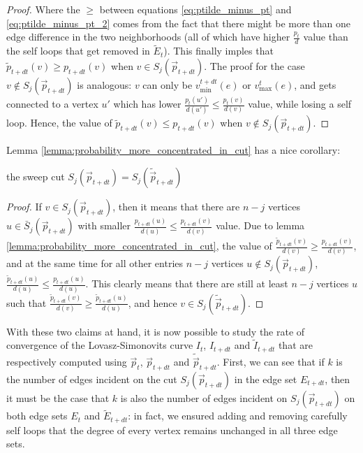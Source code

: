 \documentclass[../main.tex]{subfiles}
\begin{document}
\begin{proof}
    Where the $\geq$ between equations \ref{eq:ptilde_minus_pt} and \ref{eq:ptilde_minus_pt_2} comes from the fact that there might be more than one edge difference in the two neighborhoods (all of which have higher $\frac{p_t}{d}$ value than the self loops that get removed in $\tilde{E}_t$).
    This finally imples that $\tilde{p}_{t+dt}(v) \geq p_{t+dt}(v)$ when $v \in S_j(\vec{p}_{t+dt})$. The proof for the case $v \notin S_j(\vec{p}_{t+dt})$ is analogous: $v$ can only be $v_{\text{min}}^{t+dt}(e)$ or $v_{\text{max}}^{t}(e)$, and gets connected to a vertex $u'$ which has lower $\frac{p_t(u')}{d(u')} \leq \frac{p_t(v)}{d(v)}$ value, while losing a self loop. Hence, the value of $\tilde{p}_{t+dt}(v) \leq p_{t+dt}(v)$ when $v\notin S_j(\vec{p}_{t+dt})$.
\end{proof}

Lemma \ref{lemma:probability_more_concentrated_in_cut} has a nice corollary: 

\begin{corollary}
\label{corollary:cut_and_cut_tilde_are_the_same}
    the sweep cut $S_j(\vec{p}_{t+dt}) = S_j(\tilde{\vec{p}}_{t+dt})$
\end{corollary}

\begin{proof}
    If $v \in S_j(\vec{p}_{t+dt})$, then it means that there are $n - j$ vertices $u\in \bar{S}_j(\vec{p}_{t+dt})$ with smaller $\frac{p_{t+dt}(u)}{d(u)} \leq \frac{p_{t+dt}(v)}{d(v)}$ value. Due to lemma \ref{lemma:probability_more_concentrated_in_cut}, the value of $\frac{\tilde{p}_{t+dt}(v)}{d(v)} \geq \frac{p_{t+dt}(v)}{d(v)}$, and at the same time for all other entries $n-j$ vertices $u \notin S_j(\vec{p}_{t+dt})$, $\frac{\tilde{p}_{t+dt}(u)}{d(u)} \leq \frac{p_{t+dt}(u)}{d(u)}$. This clearly means that there are still at least $n-j$ vertices $u$ such that $\frac{\tilde{p}_{t+dt}(v)}{d(v)} \geq \frac{\tilde{p}_{t+dt}(u)}{d(u)}$, and hence $v \in S_j(\tilde{\vec{p}}_{t+dt})$.
\end{proof}

With these two claims at hand, it is now possible to study the rate of convergence of the Lovasz-Simonovits curve $I_t$, $I_{t+dt}$ and $\tilde{I}_{t+dt}$ that are respectively computed using $\vec{p}_t$, $\vec{p}_{t+dt}$ and $\tilde{\vec{p}}_{t+dt}$. First, we can see that if $k$ is the number of edges incident on the cut $S_j(\vec{p}_{t+dt})$ in the edge set $E_{t+dt}$, then it must be the case that $k$ is also the number of edges incident on $S_j(\vec{p}_{t+dt})$ on both edge sets $E_t$ and $\tilde{E}_{t+dt}$: in fact, we ensured adding and removing carefully self loops that the degree of every vertex remains unchanged in all three edge sets. 
\end{document}
